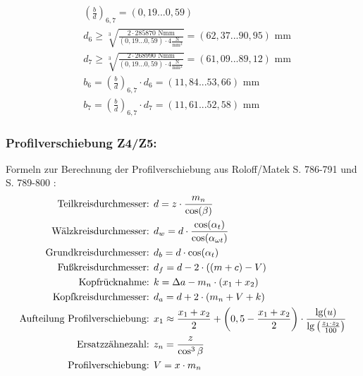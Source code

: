 \begin{itemize}
\begin{align*}
	&\left(\frac{b}{d} \right) _{6,7}=  (0,19...0,59) \\
	&d_6 \ge \sqrt[3]{\frac{2 \cdot 285870 \text{ Nmm}}{(0,19...0,59) \cdot  4 \frac{\text{N}}{\text{mm}^2}}}= (62,37...90,95) \text{ mm}\\
	&d_7 \ge \sqrt[3]{\frac{2 \cdot 268990 \text{ Nmm}}{(0,19...0,59) \cdot  4 \frac{\text{N}}{\text{mm}^2}}}= (61,09...89,12) \text{ mm}  \\
	&b_6= \left(\frac{b}{d} \right) _{6,7}  \cdot d_6 = (11,84...53,66) \text{ mm}  \\
	&b_7= \left(\frac{b}{d} \right) _{6,7}  \cdot d_7 = (11,61...52,58) \text{ mm}  
\end{align*}
\end{itemize}
\subsubsection{Profilverschiebung Z4/Z5:}
Formeln zur Berechnung der Profilverschiebung aus Roloff/Matek S. 786-791 und S. 789-800 :
\begin{align*}
\text{Teilkreisdurchmesser: }&d = z \cdot \frac{m_n}{\cos(\beta)} \\
\text{Wälzkreisdurchmesser: }&d_w = d \cdot \frac{\cos(\alpha_t)}{\cos(\alpha_{\omega t})} \\
\text{Grundkreisdurchmesser: }&d_b = d \cdot \cos(\alpha_t) \\
\text{Fußkreisdurchmesser: }&d_f = d -2 \cdot ((m+c)-V)\\
\text{Kopfrücknahme: }&k = \Delta a -m_n \cdot (x_1+x_2)\\
\text{Kopfkreisdurchmesser: }&d_a = d +2 \cdot (m_n+V +k)\\
\text{Aufteilung Profilverschiebung: }& x_1 \approx \frac{x_1 + x_2}{2} + \left( 0,5 - \frac{x_1+x_2}{2} \right) \cdot \frac{\lg(u)}{\lg\left( \frac{z_1 \cdot z_2}{100} \right)} \\
\text{Ersatzzähnezahl: }& z_n = \frac{z}{\cos^3\beta} \\
\text{Profilverschiebung: }& V = x \cdot m_n 
\end{align*}
